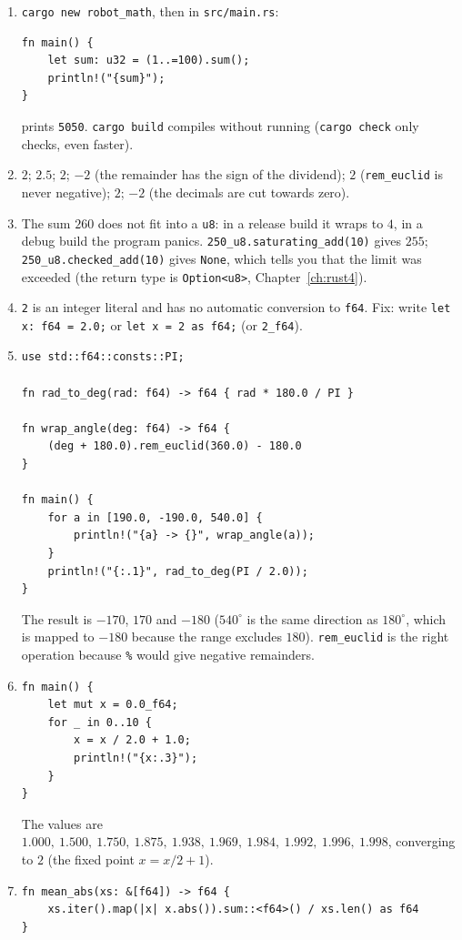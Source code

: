 \begin{enumerate}[label=\textbf{\ansnum.\arabic*}]
  \item \verb!cargo new robot_math!, then in \verb!src/main.rs!:
\begin{verbatim}
fn main() {
    let sum: u32 = (1..=100).sum();
    println!("{sum}");
}
\end{verbatim}
prints \verb!5050!. \verb!cargo build! compiles without running (\verb!cargo check! only checks, even faster).
  \item $2$; $2.5$; $2$; $-2$ (the remainder has the sign of the dividend); $2$ (\verb!rem_euclid! is never negative); $2$; $-2$ (the decimals are cut towards zero).
  \item The sum $260$ does not fit into a \verb!u8!: in a release build it wraps to $4$, in a debug build the program panics. \verb!250_u8.saturating_add(10)! gives $255$; \verb!250_u8.checked_add(10)! gives \verb!None!, which tells you that the limit was exceeded (the return type is \verb!Option<u8>!, Chapter~\ref{ch:rust4}).
  \item \verb!2! is an integer literal and has no automatic conversion to \verb!f64!. Fix: write \verb!let x: f64 = 2.0;! or \verb!let x = 2 as f64;! (or \verb!2_f64!).
  \item
\begin{verbatim}
use std::f64::consts::PI;

fn rad_to_deg(rad: f64) -> f64 { rad * 180.0 / PI }

fn wrap_angle(deg: f64) -> f64 {
    (deg + 180.0).rem_euclid(360.0) - 180.0
}

fn main() {
    for a in [190.0, -190.0, 540.0] {
        println!("{a} -> {}", wrap_angle(a));
    }
    println!("{:.1}", rad_to_deg(PI / 2.0));
}
\end{verbatim}
The result is $-170$, $170$ and $-180$ ($540^\circ$ is the same direction as $180^\circ$, which is mapped to $-180$ because the range excludes $180$). \verb!rem_euclid! is the right operation because \verb!%! would give negative remainders.
  \item
\begin{verbatim}
fn main() {
    let mut x = 0.0_f64;
    for _ in 0..10 {
        x = x / 2.0 + 1.0;
        println!("{x:.3}");
    }
}
\end{verbatim}
The values are $1.000,\ 1.500,\ 1.750,\ 1.875,\ 1.938,\ 1.969,\ 1.984,\ 1.992,\ 1.996,\ 1.998$, converging to $2$ (the fixed point $x=x/2+1$).
  \item
\begin{verbatim}
fn mean_abs(xs: &[f64]) -> f64 {
    xs.iter().map(|x| x.abs()).sum::<f64>() / xs.len() as f64
}


\end{verbatim}
\end{enumerate}

